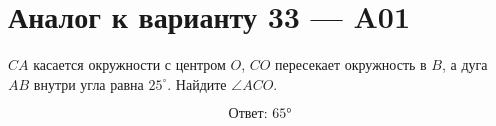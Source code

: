 


\section*{Аналог к варианту 33 — A01}
\(CA\) касается окружности с центром \(O\), \(CO\) пересекает окружность в \(B\), а дуга \(AB\) внутри угла равна \(25^\circ\). Найдите \(\angle ACO\).
\begin{center}\figTangentSecant\end{center}
\[\boxed{\text{Ответ: }65°}\]

